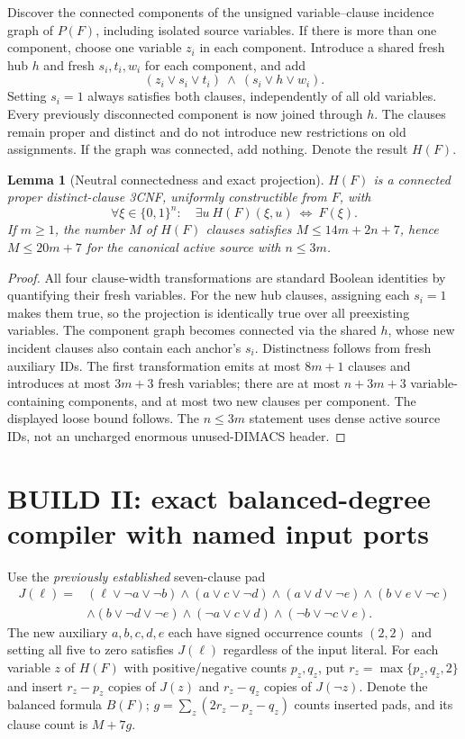 \documentclass[11pt]{article}
\newtheorem{lemma}[theorem]{Lemma}
\begin{document}
Discover the connected components of the unsigned variable--clause incidence graph of $P(F)$, including isolated source variables. If there is more than one component, choose one variable $z_i$ in each component. Introduce a shared fresh hub $h$ and fresh $s_i,t_i,w_i$ for each component, and add
\[
 (z_i\vee s_i\vee t_i)\ \land\ (s_i\vee h\vee w_i).
\tag{1}
\]
Setting $s_i=1$ always satisfies both clauses, independently of all old variables. Every previously disconnected component is now joined through $h$. The clauses remain proper and distinct and do not introduce new restrictions on old assignments. If the graph was connected, add nothing. Denote the result $H(F)$.

\begin{lemma}[Neutral connectedness and exact projection]\label{lem:hub}
$H(F)$ is a connected proper distinct-clause 3CNF, uniformly constructible from $F$, with
\[
 \forall \xi\in\{0,1\}^{n}:\quad
 \exists u\ H(F)(\xi,u)\ \iff\ F(\xi).
\]
If $m\ge1$, the number $M$ of $H(F)$ clauses satisfies $M\le14m+2n+7$, hence $M\le20m+7$ for the canonical active source with $n\le3m$.
\end{lemma}
\begin{proof}
All four clause-width transformations are standard Boolean identities by quantifying their fresh variables. For the new hub clauses, assigning each $s_i=1$ makes them true, so the projection is identically true over all preexisting variables. The component graph becomes connected via the shared $h$, whose new incident clauses also contain each anchor's $s_i$. Distinctness follows from fresh auxiliary IDs. The first transformation emits at most $8m+1$ clauses and introduces at most $3m+3$ fresh variables; there are at most $n+3m+3$ variable-containing components, and at most two new clauses per component. The displayed loose bound follows. The $n\le3m$ statement uses dense active source IDs, not an uncharged enormous unused-DIMACS header.\end{proof}

\section{BUILD II: exact balanced-degree compiler with named input ports}
Use the \emph{previously established} seven-clause pad
\begin{align*}
J(\ell)={}&(\ell\vee\neg a\vee\neg b)
\land(a\vee c\vee\neg d)\land(a\vee d\vee\neg e)
\land(b\vee e\vee\neg c)\\
&\land(b\vee\neg d\vee\neg e)
\land(\neg a\vee c\vee d)\land(\neg b\vee\neg c\vee e).
\end{align*}
The new auxiliary $a,b,c,d,e$ each have signed occurrence counts $(2,2)$ and setting all five to zero satisfies $J(\ell)$ regardless of the input literal. For each variable $z$ of $H(F)$ with positive/negative counts $p_z,q_z$, put $r_z=\max\{p_z,q_z,2\}$ and insert $r_z-p_z$ copies of $J(z)$ and $r_z-q_z$ copies of $J(\neg z)$. Denote the balanced formula $B(F)$; $g=\sum_z(2r_z-p_z-q_z)$ counts inserted pads, and its clause count is $M+7g$.
\end{document}
